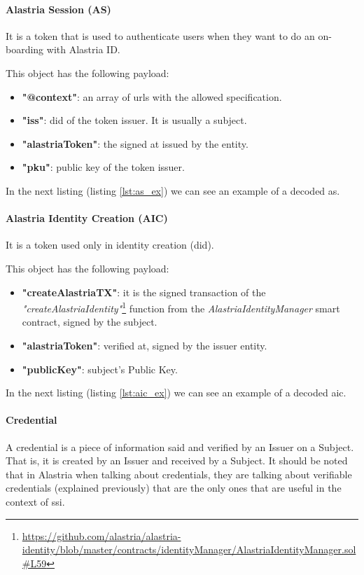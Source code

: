 \paragraph{Alastria Session (AS)}
It is a token that is used to authenticate users when they want to do an on-boarding with Alastria ID.

This object has the following payload:
\begin{itemize}
    \item \textbf{"@context"}: an array of \acrshort{url}s with the allowed specification.
    \item \textbf{"iss"}: \acrshort{did} of the token issuer. It is usually a subject.
    \item \textbf{"alastriaToken"}: the signed \acrlong{at} issued by the entity.
    \item \textbf{"pku"}: public key of the token issuer.
\end{itemize}
In the next listing (listing \ref{lst:as_ex}) we can see an example of a decoded \acrlong{as}.


\paragraph{Alastria Identity Creation (AIC)}
It is a token used only in identity creation (\acrshort{did}).

This object has the following payload:
\begin{itemize}
    \item \textbf{"createAlastriaTX"}: it is the signed transaction of the \textit{"createAlastriaIdentity"}\footnote{\url{https://github.com/alastria/alastria-identity/blob/master/contracts/identityManager/AlastriaIdentityManager.sol\#L59}} function from the \textit{AlastriaIdentityManager} smart contract, signed by the subject.
    \item \textbf{"alastriaToken"}: verified \acrlong{at}, signed by the issuer entity.
    \item \textbf{"publicKey"}: subject's Public Key.
\end{itemize}
In the next listing (listing \ref{lst:aic_ex}) we can see an example of a decoded \acrlong{aic}.


\paragraph{Credential}
A credential is a piece of information said and verified by an Issuer on a Subject. That is, it is created by an Issuer and received by a Subject. It should be noted that in Alastria when talking about credentials, they are talking about verifiable credentials (explained previously) that are the only ones that are useful in the context of \acrlong{ssi}.


